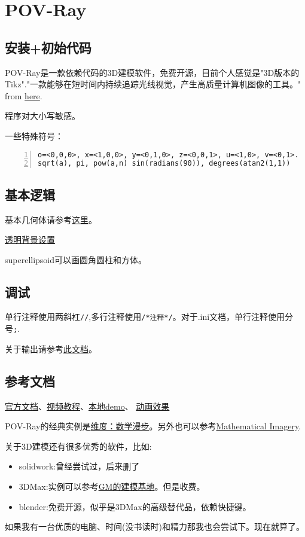 \documentclass[11pt]{amsart}
\begin{document}
\section{POV-Ray}
\subsection{安装+初始代码}
POV-Ray是一款依赖代码的3D建模软件，免费开源，目前个人感觉是"3D版本的Tikz"."一款能够在短时间内持续追踪光线视觉，产生高质量计算机图像的工具。" from \href{https://blog.csdn.net/zhr_hadoop/article/details/51289804}{here}.

程序对大小写敏感。

一些特殊符号：
\begin{lstlisting}[numbers=left,numberstyle=\tiny,numbersep=10pt]
o=<0,0,0>, x=<1,0,0>, y=<0,1,0>, z=<0,0,1>, u=<1,0>, v=<0,1>.
sqrt(a), pi, pow(a,n) sin(radians(90)), degrees(atan2(1,1))
\end{lstlisting}
\subsection{基本逻辑}
基本几何体请参考\href{http://www.f-lohmueller.de/pov_tut/all_shapes/shapes000e.htm}{这里}。

\href{http://www.imagico.de/pov/icons.php}{透明背景设置}

superellipsoid可以画圆角圆柱和方体。
\subsection{调试}
单行注释使用两斜杠\lstinline|//|,多行注释使用\lstinline|/*注释*/|。对于.ini文档，单行注释使用分号\lstinline|;|.

关于输出请参考\href{http://www.f-lohmueller.de/pov_tut/pov_inc/pov_300e.htm}{此文档}。
\subsection{参考文档}
\href{http://www.povray.org/documentation/3.7.0/t2_0.html}{官方文档}、\href{https://www.bilibili.com/video/BV1S4411e7AD}{视频教程}、\href{F://hide/POV/scenes/index.htm}{本地demo}、
\href{http://www.f-lohmueller.de/pov_tut/animate/anim001e.htm}{动画效果}

POV-Ray的经典实例是\href{http://www.dimensions-math.org/Dim_ZH_si.htm}{维度：数学漫步}。另外也可以参考\href{http://www.josleys.com/index.php}{Mathematical Imagery}.

关于3D建模还有很多优秀的软件，比如:
\begin{itemize}
\item solidwork:曾经尝试过，后来删了
\item 3DMax:实例可以参考\href{https://www.bilibili.com/video/BV1hy4y1k7k4}{GM的建模基地}。但是收费。
\item blender:免费开源，似乎是3DMax的高级替代品，依赖快捷键。
\end{itemize}
如果我有一台优质的电脑、时间(没书读时)和精力那我也会尝试下。现在就算了。
\end{document}
